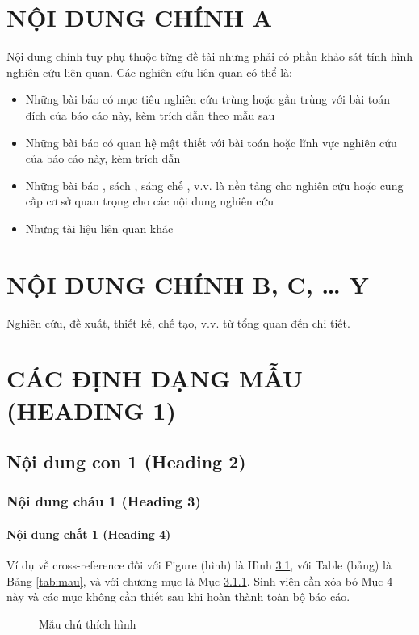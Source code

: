 \documentclass[12pt,a4paper]{report}
\begin{document}
\chapter{NỘI DUNG CHÍNH A}
Nội dung chính tuy phụ thuộc từng đề tài nhưng phải có phần khảo sát tính hình nghiên cứu liên quan. Các nghiên cứu liên quan có thể là:
\begin{itemize}
    \item Những bài báo có mục tiêu nghiên cứu trùng hoặc gần trùng với bài toán đích của báo cáo này, kèm trích dẫn theo mẫu sau \cite{1}
    \item Những bài báo có quan hệ mật thiết với bài toán hoặc lĩnh vực nghiên cứu của báo cáo này, kèm trích dẫn \cite{2}
    \item Những bài báo \cite{1, 3, 4, 5}, sách \cite{6, 7, 8}, sáng chế \cite{9, 10}, v.v. là nền tảng cho nghiên cứu hoặc cung cấp cơ sở quan trọng cho các nội dung nghiên cứu
    \item Những tài liệu liên quan khác
\end{itemize}

\chapter{NỘI DUNG CHÍNH B, C, … Y}
Nghiên cứu, đề xuất, thiết kế, chế tạo, v.v. từ tổng quan đến chi tiết.

\chapter{CÁC ĐỊNH DẠNG MẪU (HEADING 1)}
\section{Nội dung con 1 (Heading 2)}
\subsection{Nội dung cháu 1 (Heading 3)} \label{subsec:chau}
\subsubsection{Nội dung chắt 1 (Heading 4)}

Ví dụ về cross-reference đối với Figure (hình) là Hình \ref{fig:mau}, với Table (bảng) là Bảng \ref{tab:mau}, và với chương mục là Mục \ref{subsec:chau}. Sinh viên cần xóa bỏ Mục 4 này và các mục không cần thiết sau khi hoàn thành toàn bộ báo cáo.

\begin{figure}[h]
    \centering
    \caption{Mẫu chú thích hình}
    \label{fig:mau}
\end{figure}
\end{document}
